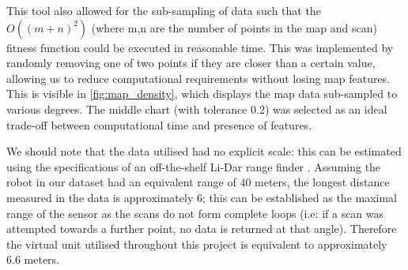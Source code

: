 \documentclass[authoryearcitations]{UoYCSproject}
\begin{document}
This tool also allowed for the sub-sampling of data such that the $O((m+n)^2)$  (where m,n are the number of points in the map and scan) fitness function could be executed in reasonable time. This was implemented by randomly removing one of two points if they are closer than a certain value, allowing us to reduce computational requirements without losing map features. This is visible in \autoref{fig:map_density}, which displays the map data sub-sampled to various degrees. The middle chart (with tolerance 0.2) was selected as an ideal trade-off between computational time and presence of features.

We should note that the data utilised had no explicit scale: this can be estimated using the specifications of an off-the-shelf Li-Dar range finder \cite{noauthor_undated-bu}. Assuming the robot in our dataset had an equivalent range of 40 meters, the longest distance measured in the data is approximately 6; this can be established as the maximal range of the sensor as the scans do not form complete loops (i.e: if a scan was attempted towards a further point, no data is returned at that angle). Therefore the virtual unit utilised throughout this project is equivalent to approximately 6.6 meters.
\end{document}
